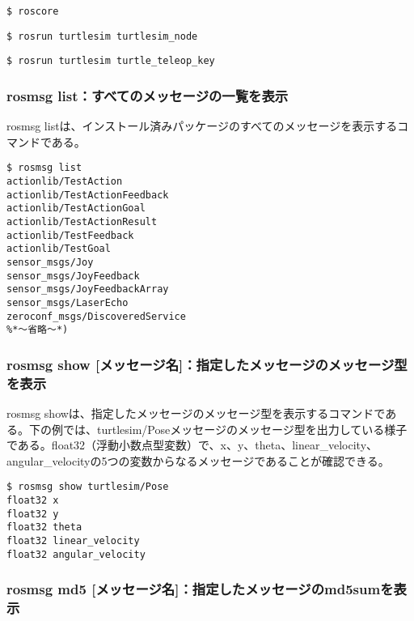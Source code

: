 \begin{lstlisting}[language=ROS]
$ roscore
\end{lstlisting}

\begin{lstlisting}[language=ROS]
$ rosrun turtlesim turtlesim_node
\end{lstlisting}

\begin{lstlisting}[language=ROS]
$ rosrun turtlesim turtle_teleop_key
\end{lstlisting}

\subsubsection{rosmsg list：すべてのメッセージの一覧を表示}

rosmsg listは、インストール済みパッケージのすべてのメッセージを表示するコマンドである。

\begin{lstlisting}[language=ROS]
$ rosmsg list
actionlib/TestAction
actionlib/TestActionFeedback
actionlib/TestActionGoal
actionlib/TestActionResult
actionlib/TestFeedback
actionlib/TestGoal
sensor_msgs/Joy
sensor_msgs/JoyFeedback
sensor_msgs/JoyFeedbackArray
sensor_msgs/LaserEcho
zeroconf_msgs/DiscoveredService
%*〜省略〜*)
\end{lstlisting}

\subsubsection{rosmsg show [メッセージ名]：指定したメッセージのメッセージ型を表示}

rosmsg showは、指定したメッセージのメッセージ型を表示するコマンドである。下の例では、turtlesim/Poseメッセージのメッセージ型を出力している様子である。float32（浮動小数点型変数）で、x、y、theta、linear\_velocity、angular\_velocityの5つの変数からなるメッセージであることが確認できる。

\begin{lstlisting}[language=ROS]
$ rosmsg show turtlesim/Pose
float32 x
float32 y
float32 theta
float32 linear_velocity
float32 angular_velocity
\end{lstlisting}

\subsubsection{rosmsg md5 [メッセージ名]：指定したメッセージのmd5sumを表示}

